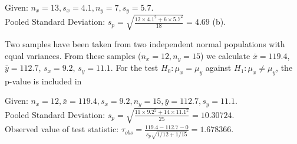 \documentclass[bigtut]{tutorial}
\begin{document}
\begin{tutorial}
\begin{questions}



\begin{solution}
Given: $n_{x}=13, s_{x}=4.1, n_{y}=7, s_{y}=5.7$. \\
Pooled Standard Deviation: $s_{p} = \sqrt{ \frac{ 12 \times 4.1^2 + 6 \times 5.7^2 }{18}} = 4.69$ (b).
\end{solution}




\question
Two samples have been taken from two
independent normal populations with equal variances. From these
samples ($n_x = 12, n_y = 15$) we calculate $\bar x=119.4$, $\bar
y=112.7$, $s_x=9.2$, $s_y=11.1$. For the test $H_0:\mu_x=\mu_y$
against $H_1: \mu_x \not= \mu_y$, the p-value is included in

\begin{solution}
Given: $n_{x}=12, \bar{x} = 119.4, s_{x}=9.2, n_{y}=15, \bar{y} = 112.7, s_{y}=11.1$. \\
Pooled Standard Deviation: $s_{p} = \sqrt{ \frac{ 11 \times 9.2^2 + 14 \times 11.1^2 }{25}} = 10.30724$. \\
 Observed value of test statistic: $\tau_{obs} =  \frac{ 119.4-112.7 - 0 }{s_{p} \sqrt{1/12 + 1/15}} = 1.678366$. \\


\end{solution}
\end{questions}
\end{tutorial}
\end{document}

